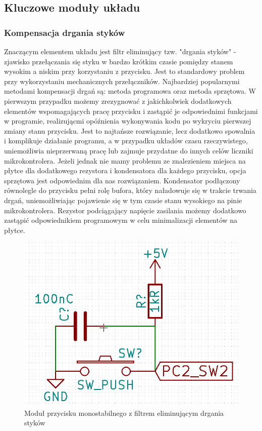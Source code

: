 \documentclass{article}
\begin{document}
	
\subsection{Kluczowe moduły układu}
\subsubsection{Kompensacja drgania styków}
Znaczącym elementem układu jest filtr eliminujący tzw. "drgania styków" - zjawisko przełączania się styku w bardzo krótkim czasie pomiędzy stanem wysokim a niskim przy korzystaniu z przycisku. Jest to standardowy problem przy wykorzystaniu mechanicznych przełączników. Najbardziej popularnymi metodami kompensacji drgań są: metoda programowa oraz metoda sprzętowa. W pierwszym przypadku możemy zrezygnować z jakichkolwiek dodatkowych elementów wspomagających pracę przycisku i zastąpić je odpowiednimi funkcjami w programie, realizującmi opóźnienia wykonywania kodu po wykryciu pierwszej zmiany stanu przycisku. Jest to najtańsze rozwiązanie, lecz dodatkowo spowalnia i komplikuje działanie programu, a w przypadku układów czasu rzeczywistego, uniemożliwia nieprzerwaną pracę lub zajmuje przydatne do innych celów liczniki mikrokontrolera. Jeżeli jednak nie mamy problemu ze znalezieniem miejsca na płytce dla dodatkowego rezystora i kondensatora dla każdego przycisku, opcja sprzętowa jest odpowiednim dla nas rozwiązaniem. Kondensator podłączony równolegle do przycisku pełni rolę bufora, który naładowuje się w trakcie trwania drgań, uniemożliwiając pojawienie się w tym czasie stanu wysokiego na pinie mikrokontrolera. Rezystor podciągający napięcie zasilania możemy dodatkowo zastąpić odpowiednikiem programowym w celu minimalizacji elementów na płytce. 

\begin{figure}[h!]
	\center
	\includegraphics[scale=0.3]{img/drgania_stykow.png}
	\caption{Moduł przycisku monostabilnego z filtrem eliminującym drgania styków}
	\label{fig:zdjecie1}
\end{figure}
\end{document}
